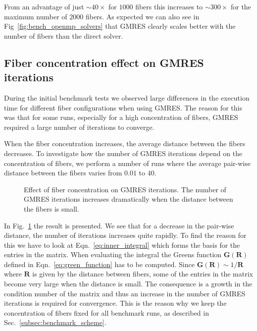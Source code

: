 From an advantage of just ${\sim}40×$ for $1000$ fibers this increases to ${\sim}300×$ for the maximum number of $2000$ fibers. As expected we can also see in Fig~\ref{fig:bench_openmp_solvers} that GMRES clearly scales better with the number of fibers than the direct solver.

\subsection{Fiber concentration effect on GMRES iterations}
\label{subsec:example_concentration_gmres}

During the initial benchmark tests we observed large differences in the execution time for different fiber configurations when using GMRES. The reason for this was that for some runs, especially for a high concentration of fibers, GMRES required a large number of iterations to converge.

When the fiber concentration increases, the average distance between the fibers decreases. To investigate how the number of GMRES iterations depend on the concentration of fibers, we perform a number of runs where the average pair-wise distance between the fibers varies from $0.01$ to $40$.

\begin{figure}[htbp]
  \centering
  \caption[Effect of fiber concentration on GMRES iterations.]{Effect of fiber concentration on GMRES iterations. The number of GMRES iterations increases dramatically when the distance between the fibers is small.}
  \label{fig:concentration_gmres}
\end{figure}

In Fig.~\ref{fig:concentration_gmres} the result is presented. We see that for a decrease in the pair-wise distance, the number of iterations increases quite rapidly. To find the reason for this we have to look at Eqn.~\eqref{eq:inner_integral} which forms the basis for the entries in the matrix. When evaluating the integral the Greens function $\mathbf{G}(\mathbf{R})$ defined in Eqn.~\eqref{eq:green_function} has to be computed. Since $\mathbf{G}(\mathbf{R}) \sim 1/\mathbf{R}$ where $\mathbf{R}$ is given by the distance between fibers, some of the entries in the matrix become very large when the distance is small. The consequence is a growth in the condition number of the matrix and thus an increase in the number of GMRES iterations is required for convergence. This is the reason why we keep the concentration of fibers fixed for all benchmark runs, as described in Sec.~\ref{subsec:benchmark_scheme}.

